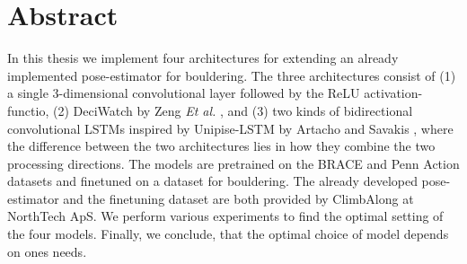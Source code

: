\documentclass[./main.tex]{subfiles}
\begin{document}
\section*{Abstract}
In this thesis we implement four architectures for extending an already implemented pose-estimator for bouldering. The three architectures consist of (1) a single 3-dimensional convolutional layer followed by the ReLU activation-functio, (2) DeciWatch by Zeng \textit{Et al.} \cite{https://doi.org/10.48550/arxiv.2203.08713}, and (3) two kinds of bidirectional convolutional LSTMs inspired by Unipise-LSTM by Artacho and Savakis \cite{https://doi.org/10.48550/arxiv.2001.08095}, where the difference between the two architectures lies in how they combine the two processing directions. The models are pretrained on the BRACE and Penn Action datasets and finetuned on a dataset for bouldering. The already developed pose-estimator and the finetuning dataset are both provided by ClimbAlong at NorthTech ApS. We perform various experiments to find the optimal setting of the four models. Finally, we conclude, that the optimal choice of model depends on ones needs.
\end{document}
